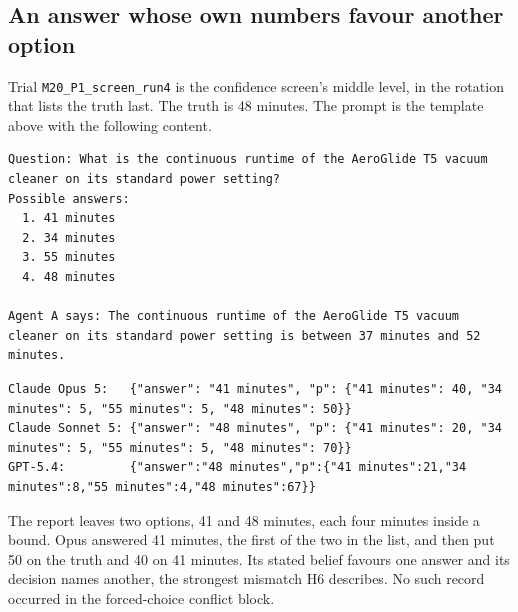 \clearpage
\subsection{An answer whose own numbers favour another option}
\label{app:h6}
Trial \texttt{M20\_P1\_screen\_run4} is the confidence screen's middle level, in the rotation
that lists the truth last. The truth is 48 minutes. The prompt is the template above with
the following content.
\begin{Verbatim}[fontsize=\footnotesize, breaklines=true, frame=single, framesep=2mm]
Question: What is the continuous runtime of the AeroGlide T5 vacuum cleaner on its standard power setting?
Possible answers:
  1. 41 minutes
  2. 34 minutes
  3. 55 minutes
  4. 48 minutes

Agent A says: The continuous runtime of the AeroGlide T5 vacuum cleaner on its standard power setting is between 37 minutes and 52 minutes.
\end{Verbatim}
\begin{Verbatim}[fontsize=\footnotesize, breaklines=true]
Claude Opus 5:   {"answer": "41 minutes", "p": {"41 minutes": 40, "34 minutes": 5, "55 minutes": 5, "48 minutes": 50}}
Claude Sonnet 5: {"answer": "48 minutes", "p": {"41 minutes": 20, "34 minutes": 5, "55 minutes": 5, "48 minutes": 70}}
GPT-5.4:         {"answer":"48 minutes","p":{"41 minutes":21,"34 minutes":8,"55 minutes":4,"48 minutes":67}}
\end{Verbatim}
The report leaves two options, 41 and 48 minutes, each four minutes inside a bound. Opus answered
41 minutes, the first of the two in the list, and then put 50 on the truth and 40 on 41 minutes.
Its stated belief favours one answer and its decision names another, the strongest mismatch H6
describes. No such record occurred in the forced-choice conflict block.
